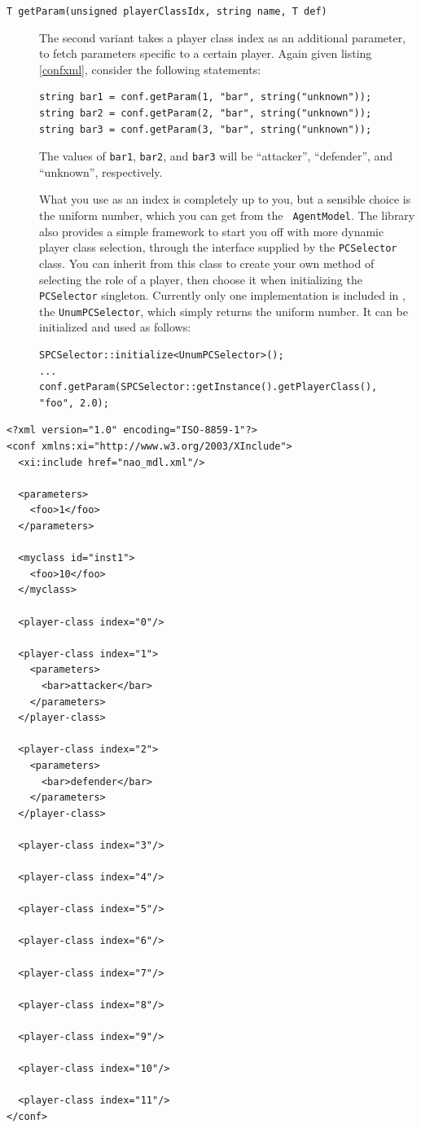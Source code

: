 \begin{description}
\item[\tt T getParam(unsigned playerClassIdx, string name, T def)] The
  second variant takes a player class index as an additional
  parameter, to fetch parameters specific to a certain player. Again
  given listing \ref{confxml}, consider the following statements:
\begin{lstlisting}[frame=single]
string bar1 = conf.getParam(1, "bar", string("unknown"));
string bar2 = conf.getParam(2, "bar", string("unknown"));
string bar3 = conf.getParam(3, "bar", string("unknown"));
\end{lstlisting}
  The values of {\tt bar1}, {\tt bar2}, and {\tt bar3} will be
  ``attacker'', ``defender'', and ``unknown'', respectively.

  What you use as an index is completely up to you, but a sensible
  choice is the uniform number, which you can get from the {\tt
    AgentModel}. The library also provides a simple framework to start
  you off with more dynamic player class selection, through the
  interface supplied by the {\tt PCSelector} class. You can inherit
  from this class to create your own method of selecting the role of a
  player, then choose it when initializing the {\tt PCSelector}
  singleton. Currently only one implementation is included in
  \libbats, the {\tt UnumPCSelector}, which simply returns the uniform
  number. It can be initialized and used as follows:
\begin{lstlisting}[frame=single]
SPCSelector::initialize<UnumPCSelector>();
...
conf.getParam(SPCSelector::getInstance().getPlayerClass(), "foo", 2.0);
\end{lstlisting}

\end{description}

\begin{lstlisting}[float,caption={\tt conf.xml},label=confxml,frame=single]
<?xml version="1.0" encoding="ISO-8859-1"?>
<conf xmlns:xi="http://www.w3.org/2003/XInclude">  
  <xi:include href="nao_mdl.xml"/>

  <parameters>
    <foo>1</foo>
  </parameters>

  <myclass id="inst1">
    <foo>10</foo>
  </myclass>

  <player-class index="0"/>

  <player-class index="1">
    <parameters>
      <bar>attacker</bar>
    </parameters>
  </player-class>

  <player-class index="2">
    <parameters>
      <bar>defender</bar>
    </parameters>
  </player-class>

  <player-class index="3"/>

  <player-class index="4"/>

  <player-class index="5"/>

  <player-class index="6"/>

  <player-class index="7"/>

  <player-class index="8"/>

  <player-class index="9"/>

  <player-class index="10"/>

  <player-class index="11"/>
</conf>  
\end{lstlisting}

